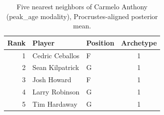 \begin{table}[htbp]
  \centering\small
  \begin{tabular}{rllc}
    \toprule
    Rank & Player & Position & Archetype \\
    \midrule
    1 & Cedric Ceballos & F & 1 \\
    2 & Sean Kilpatrick & G & 1 \\
    3 & Josh Howard & F & 1 \\
    4 & Larry Robinson & G & 1 \\
    5 & Tim Hardaway & G & 1 \\
    \bottomrule
  \end{tabular}
  \caption{Five nearest neighbors of Carmelo Anthony (peak_age modality), Procrustes-aligned posterior mean.}
  \label{tab:Carmelo_Anthony_neighbors_peak_age}
\end{table}

